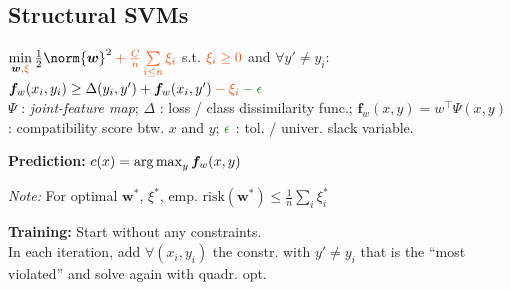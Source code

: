 \subsection{Structural SVMs}

$\min\limits_{\bm w \color{OrangeRed}, \xi} \frac12 \norm{\bm w}^2 \color{OrangeRed} + \frac{C}{n} \sum\limits_{i\leq n} \xi_i$
\quad s.t. $\color{OrangeRed} \xi_i \geq 0$ and $\forall y' \neq y_i :$\\
\quad $\bm  f_w(x_i, y_i)\geq \Delta(y_i, y') + \bm f_w(x_i, y') \color{OrangeRed} - \xi_i \color{Green} - \epsilon$\\ %


$\Psi$ : \textit{joint-feature map}; \:
$\Delta$ : loss / class dissimilarity func.; \:
$\bm f_w(x,y) = w^\top \Psi(x,y)$ : compatibility score btw. $x$ and $y$; \:
$\color{Green} \epsilon$ : tol. / univer. slack variable.

\textbf{Prediction:} \: $c(x) = \operatorname{arg\,max}_y \bm f_w(x,y)$
\vspace{-3pt}

\textit{Note:} For optimal $\bm w^\ast$, $\xi^\ast$, $\textrm{emp. risk}(\bm w^\ast) \leq \frac1n \sum_i \xi_i^\ast$

\textbf{Training:} Start without any constraints.\\
In each iteration, add $\forall(x_i,y_i)$ the constr. with $y' {\neq} y_i$ that is the ``most violated'' and solve again with quadr. opt.

